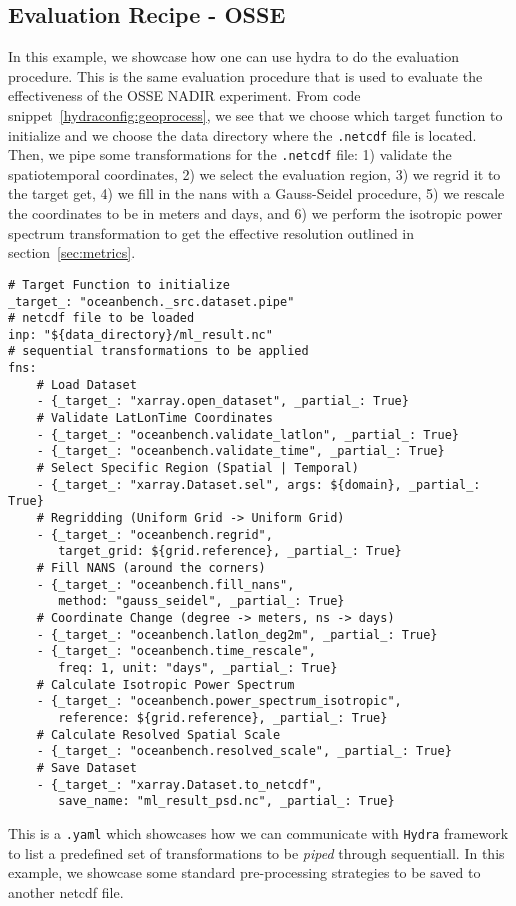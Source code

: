 \newpage
\subsection{Evaluation Recipe - OSSE}

In this example, we showcase how one can use hydra to do the evaluation procedure. This is the same evaluation procedure that is used to evaluate the effectiveness of the OSSE NADIR experiment. From code snippet~\ref{hydraconfig:geoprocess}, we see that we choose which target function to initialize and we choose the data directory where the \texttt{.netcdf} file is located. Then, we pipe some transformations for the \texttt{.netcdf} file: 1) validate the spatiotemporal coordinates, 2) we select the evaluation region, 3) we regrid it to the target get, 4) we fill in the nans with a Gauss-Seidel procedure, 5) we rescale the coordinates to be in meters and days, and 6) we perform the isotropic power spectrum transformation to get the effective resolution outlined in section~\ref{sec:metrics}.

\begin{listing}[ht!]
\begin{verbatim}
# Target Function to initialize
_target_: "oceanbench._src.dataset.pipe"
# netcdf file to be loaded
inp: "${data_directory}/ml_result.nc"
# sequential transformations to be applied
fns:
    # Load Dataset
    - {_target_: "xarray.open_dataset", _partial_: True}
    # Validate LatLonTime Coordinates
    - {_target_: "oceanbench.validate_latlon", _partial_: True}
    - {_target_: "oceanbench.validate_time", _partial_: True}
    # Select Specific Region (Spatial | Temporal)
    - {_target_: "xarray.Dataset.sel", args: ${domain}, _partial_: True}
    # Regridding (Uniform Grid -> Uniform Grid)
    - {_target_: "oceanbench.regrid", 
       target_grid: ${grid.reference}, _partial_: True}
    # Fill NANS (around the corners)
    - {_target_: "oceanbench.fill_nans", 
       method: "gauss_seidel", _partial_: True}
    # Coordinate Change (degree -> meters, ns -> days)
    - {_target_: "oceanbench.latlon_deg2m", _partial_: True}
    - {_target_: "oceanbench.time_rescale", 
       freq: 1, unit: "days", _partial_: True}
    # Calculate Isotropic Power Spectrum
    - {_target_: "oceanbench.power_spectrum_isotropic", 
       reference: ${grid.reference}, _partial_: True}
    # Calculate Resolved Spatial Scale
    - {_target_: "oceanbench.resolved_scale", _partial_: True}
    # Save Dataset
    - {_target_: "xarray.Dataset.to_netcdf", 
       save_name: "ml_result_psd.nc", _partial_: True}
\end{verbatim}
\label{hydraconfig:evaluation}
\caption{This is a \texttt{.yaml} which showcases how we can communicate with \texttt{Hydra} framework to list a predefined set of transformations to be \textit{piped} through sequentiall. In this example, we showcase some standard pre-processing strategies to be saved to another netcdf file.}
\end{listing}




